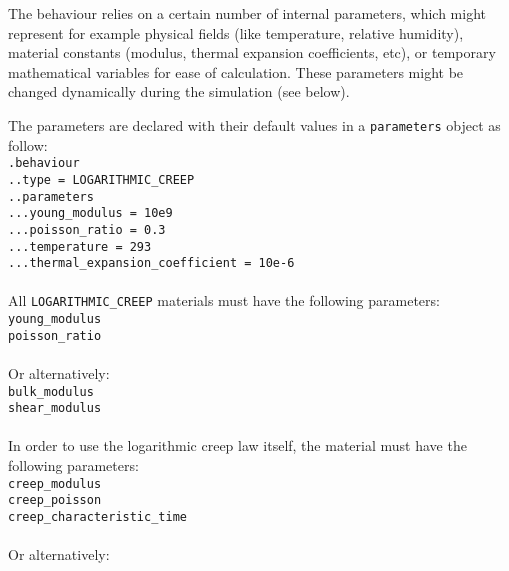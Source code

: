 \documentclass[10pt]{article}
\begin{document}
The behaviour relies on a certain number of internal parameters, which might represent for example physical fields (like temperature, relative humidity), material constants (modulus, thermal expansion coefficients, etc), or temporary mathematical variables for ease of calculation. These parameters might be changed dynamically during the simulation (see below).

The parameters are declared with their default values in a \verb+parameters+ object as follow:\\

\noindent \verb+.behaviour+\\
\verb+..type = LOGARITHMIC_CREEP+\\
\verb+..parameters+\\
\verb+...young_modulus = 10e9+\\
\verb+...poisson_ratio = 0.3+\\
\verb+...temperature = 293+\\
\verb+...thermal_expansion_coefficient = 10e-6+

\paragraph{} All \verb+LOGARITHMIC_CREEP+ materials must have the following parameters:\\

\noindent \verb+young_modulus+\\
\verb+poisson_ratio+

\paragraph{} Or alternatively:\\

\noindent \verb+bulk_modulus+\\
\verb+shear_modulus+

\paragraph{} In order to use the logarithmic creep law itself, the material must have the following parameters:\\

\noindent \verb+creep_modulus+\\
\verb+creep_poisson+\\
\verb+creep_characteristic_time+

\paragraph{} Or alternatively:\\
\end{document}

